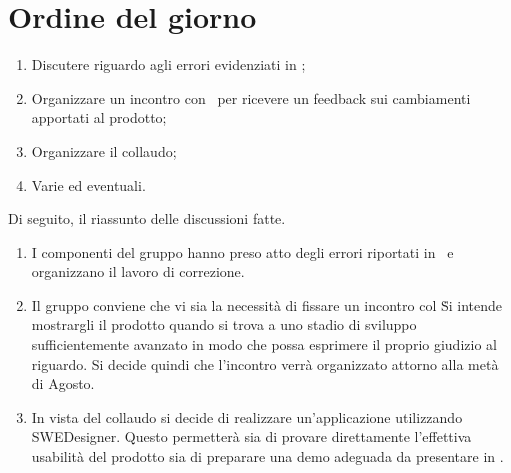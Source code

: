 \documentclass[../AnalisiDeiRequisiti.tex]{subfiles}
\begin{document}
	\section*{Ordine del giorno}
	\begin{enumerate}
		\item Discutere riguardo agli errori evidenziati in \revisionediqualifica;
		\item Organizzare un incontro con \proponente\ per ricevere un feedback sui cambiamenti apportati al prodotto;
		\item Organizzare il collaudo;
		\item Varie ed eventuali.
	\end{enumerate}
	Di seguito, il riassunto delle discussioni fatte.
	\begin{enumerate}
		\item I componenti del gruppo hanno preso atto degli errori riportati in \revisionediqualifica\ e organizzano il lavoro di correzione.
		\item Il gruppo conviene che vi sia la necessità di fissare un incontro col \proponente\. Si intende mostrargli il prodotto quando si trova a uno stadio di sviluppo sufficientemente avanzato in modo che possa esprimere il proprio giudizio al riguardo. Si decide quindi che l'incontro verrà organizzato attorno alla metà di Agosto.
		\item In vista del collaudo si decide di realizzare un'applicazione utilizzando SWEDesigner. Questo permetterà sia di provare direttamente l'effettiva usabilità del prodotto sia di preparare una demo adeguada da presentare in \revisionediaccettazione.
	\end{enumerate}
	
\end{document}
